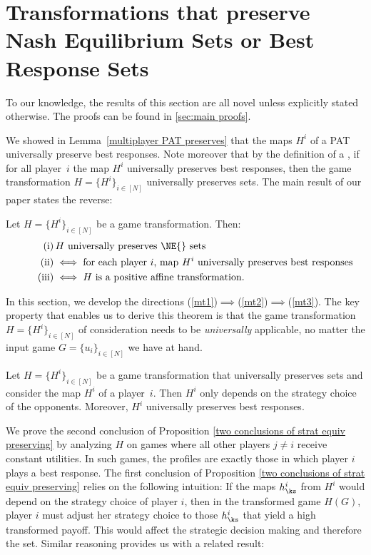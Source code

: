 


\section{Transformations that preserve Nash Equilibrium Sets or Best Response Sets}
\label{sec:strat equiv preserving}
To our knowledge, the results of this section are all novel unless explicitly stated otherwise. The proofs can be found in \ref{sec:main proofs}.

We showed in Lemma~\ref{multiplayer PAT preserves} that the maps $H^i$ of a PAT universally preserve best responses. Note moreover that by the definition of a \NE{}, if for all player~$i$ the map $H^i$ universally preserves best responses, then the game transformation $H = \{H^i\}_{i \in [N]}$ universally preserves \NE{} sets. The main result of our paper states the reverse:
\begin{thm*}
Let $H = \{H^i\}_{i \in [N]}$ be a game transformation. Then:
\begin{align}
\label{mt1} \tag{i}
&\, H \text{ universally preserves \NE{} sets} \\
\label{mt2} \tag{ii}
&\iff \text{for each player~$i$, map $H^i$ universally preserves best responses} \\
\label{mt3} \tag{iii}
&\iff H \text{ is a positive affine transformation}.
\end{align}
\end{thm*}
In this section, we develop the directions (\ref{mt1})$\implies$(\ref{mt2})$\implies$(\ref{mt3}). The key property that enables us to derive this theorem is that the game transformation $H = \{H^i\}_{i \in [N]}$ of consideration needs to be \textit{universally} applicable, no matter the input game $G = \{u_i\}_{i \in [N]}$ we have at hand. 

\begin{prop}
\label{two conclusions of strat equiv preserving}
Let $H = \{H^i\}_{i \in [N]}$ be a game transformation that universally preserves \NE{} sets and consider the map $H^i$ of a player~$i$. Then $H^i$ only depends on the strategy choice of the opponents. Moreover, $H^i$ universally preserves best responses.
\end{prop}

We prove the second conclusion of Proposition \ref{two conclusions of strat equiv preserving} by analyzing $H$ on games where all other players $j \neq i$ receive constant utilities. In such games, the \NE{} profiles are exactly those in which player $i$ plays a best response. The first conclusion of Proposition \ref{two conclusions of strat equiv preserving} relies on the following intuition: If the maps $h_{\ks}^i$ from $H^i$ would depend on the strategy choice of player $i$, then in the transformed game $H(G)$, player $i$ must adjust her strategy choice to those $h_{\ks}^i$ that yield a high transformed payoff. This would affect the strategic decision making and therefore the \NE{} set. Similar reasoning provides us with a related result:

